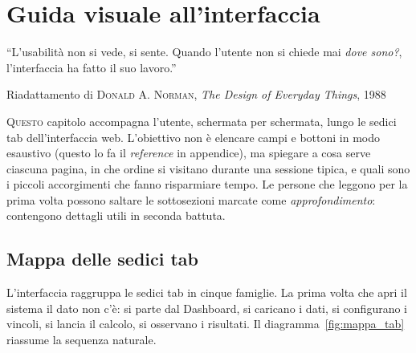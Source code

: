 \chapter{Guida visuale all'interfaccia}
\label{ch:guida_ui}

\epigraph{``L'usabilit\`a non si vede, si sente. Quando l'utente
non si chiede mai \emph{dove sono?}, l'interfaccia ha fatto il
suo lavoro.''}{Riadattamento di \textsc{Donald A. Norman}, \emph{The
Design of Everyday Things}, 1988}

\lettrine[lines=3]{Q}{uesto} capitolo accompagna l'utente,
schermata per schermata, lungo le sedici tab dell'interfaccia
web. L'obiettivo non \`e elencare campi e bottoni in modo
esaustivo (questo lo fa il \emph{reference} in appendice), ma
spiegare a cosa serve ciascuna pagina, in che ordine si visitano
durante una sessione tipica, e quali sono i piccoli accorgimenti
che fanno risparmiare tempo. Le persone che leggono per la prima
volta possono saltare le sottosezioni marcate come
\emph{approfondimento}: contengono dettagli utili in seconda
battuta.

\section{Mappa delle sedici tab}
\label{sec:mappa_tab}

L'interfaccia raggruppa le sedici tab in cinque famiglie. La
prima volta che apri il sistema il dato non c'\`e: si parte dal
Dashboard, si caricano i dati, si configurano i vincoli, si
lancia il calcolo, si osservano i risultati. Il
diagramma~\ref{fig:mappa_tab} riassume la sequenza naturale.

